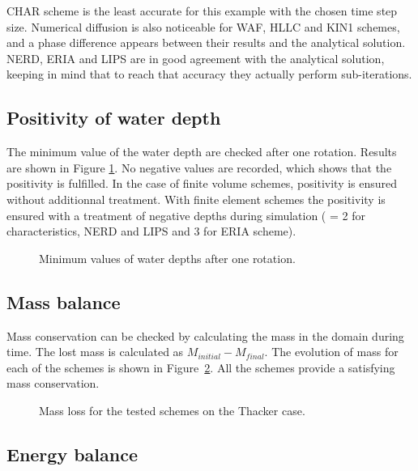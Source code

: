 CHAR scheme is the least accurate for this example with the chosen time step size.
Numerical diffusion is also noticeable for WAF, HLLC and KIN1 schemes, and a
phase difference appears between their results and the analytical solution.
NERD, ERIA and LIPS are in good agreement with the analytical solution, keeping
in mind that to reach that accuracy they actually perform sub-iterations.

\subsection{Positivity of water depth}

The minimum value of the water depth are checked after one rotation.
Results are shown in Figure \ref{t2d:thacker:minmax}.
No negative values are recorded, which shows that the positivity is fulfilled.
In the case of finite volume schemes, positivity is ensured without additionnal
treatment.
With finite element schemes the positivity is ensured with a treatment of
negative depths during simulation ( = 2 for
characteristics, NERD and LIPS and 3 for ERIA scheme).

\begin{figure}[H]
\centering
{}
\caption{Minimum values of water depths after one rotation.}
\label{t2d:thacker:minmax}
\end{figure}

\subsection{Mass balance}

Mass conservation can be checked by calculating the mass in the domain during
time.
The lost mass is calculated as $M_{initial} - M_{final}$.
The evolution of mass for each of the schemes is shown in
Figure~\ref{fig:thacker:VoLTime}.
All the schemes provide a satisfying mass conservation.

\begin{figure}[H]
\centering
  \caption{Mass loss for the tested schemes on the Thacker case.}
\label{fig:thacker:VoLTime}
\end{figure}

\subsection{Energy balance}


